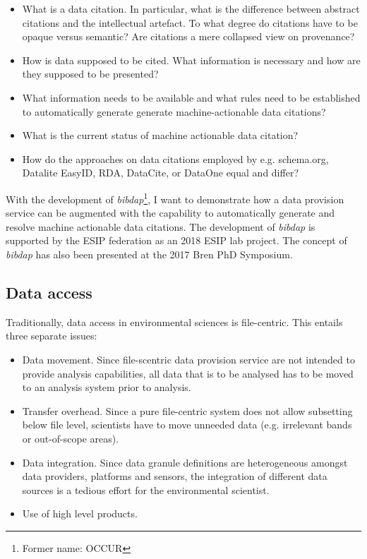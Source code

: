 \documentclass[a4paper,10pt]{article}
\begin{document}
\begin{itemize}
 \item What is a data citation. In particular, what is the difference between abstract citations and the intellectual artefact. To what degree do citations have to be opaque versus semantic? Are citations a mere collapsed view on provenance?
 \item How is data supposed to be cited. What information is necessary and how are they supposed to be presented?
 \item What information needs to be available and what rules need to be established to automatically generate generate machine-actionable data citations?
 \item What is the current status of machine actionable data citation? 
 \item How do the approaches on data citations employed by e.g. schema.org, Datalite EasyID, RDA, DataCite, or DataOne equal and differ?
\end{itemize}

With the development of \textit{bibdap}\footnote{Former name: OCCUR}, I want to demonstrate how a data provision service can be augmented with the capability to automatically generate and resolve machine actionable data citations. The development of \textit{bibdap} is supported by the ESIP federation as an 2018 ESIP lab project. The concept of \textit{bibdap} has also been presented at the 2017 Bren PhD Symposium.
  

  

\subsection{Data access}

Traditionally, data access in environmental sciences is file-centric. This entails three separate issues:

\begin{itemize}
 \item Data movement.
       Since file-scentric data provision service are not intended to provide analysis capabilities, all data that is to be analysed has to be moved to an analysis system prior to analysis.
 \item Transfer overhead. 
       Since a pure file-centric system does not allow subsetting below file level, scientists have to move unneeded data (e.g. irrelevant bands or out-of-scope areas).
 \item Data integration.
       Since data granule definitions are heterogeneous amongst data providers, platforms and sensors, the integration of different data sources is a tedious effort for the environmental scientist. 
 \item Use of high level products.
\end{itemize}
\end{document}
